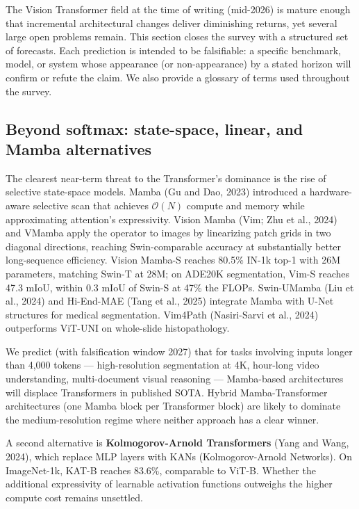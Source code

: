 The Vision Transformer field at the time of writing (mid-2026) is mature enough that incremental architectural changes deliver diminishing returns, yet several large open problems remain. This section closes the survey with a structured set of forecasts. Each prediction is intended to be falsifiable: a specific benchmark, model, or system whose appearance (or non-appearance) by a stated horizon will confirm or refute the claim. We also provide a glossary of terms used throughout the survey.

\subsection{Beyond softmax: state-space, linear, and Mamba alternatives}\label{beyond-softmax-state-space-linear-and-mamba-alternatives}

The clearest near-term threat to the Transformer's dominance is the rise of selective state-space models. Mamba (Gu and Dao, 2023) introduced a hardware-aware selective scan that achieves \(\mathcal{O}(N)\) compute and memory while approximating attention's expressivity. Vision Mamba (Vim; Zhu et al., 2024) and VMamba apply the operator to images by linearizing patch grids in two diagonal directions, reaching Swin-comparable accuracy at substantially better long-sequence efficiency. Vision Mamba-S reaches 80.5\% IN-1k top-1 with 26M parameters, matching Swin-T at 28M; on ADE20K segmentation, Vim-S reaches 47.3 mIoU, within 0.3 mIoU of Swin-S at 47\% the FLOPs. Swin-UMamba (Liu et al., 2024) and Hi-End-MAE (Tang et al., 2025) integrate Mamba with U-Net structures for medical segmentation. Vim4Path (Nasiri-Sarvi et al., 2024) outperforms ViT-UNI on whole-slide histopathology.

We predict (with falsification window 2027) that for tasks involving inputs longer than 4,000 tokens --- high-resolution segmentation at 4K, hour-long video understanding, multi-document visual reasoning --- Mamba-based architectures will displace Transformers in published SOTA. Hybrid Mamba-Transformer architectures (one Mamba block per Transformer block) are likely to dominate the medium-resolution regime where neither approach has a clear winner.

A second alternative is \textbf{Kolmogorov-Arnold Transformers} (Yang and Wang, 2024), which replace MLP layers with KANs (Kolmogorov-Arnold Networks). On ImageNet-1k, KAT-B reaches 83.6\%, comparable to ViT-B. Whether the additional expressivity of learnable activation functions outweighs the higher compute cost remains unsettled.

